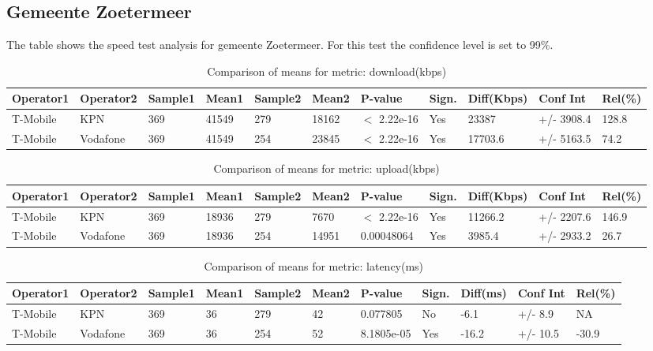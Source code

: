 \documentclass[]{article}
\begin{document}
\normalsize

\newpage

\subsection{Gemeente Zoetermeer}\label{gemeente-zoetermeer}

The table shows the speed test analysis for gemeente Zoetermeer. For
this test the confidence level is set to 99\%.

\begin{table}[ht]
\centering
{\footnotesize
\begin{tabular}{lllllllllll}
  \hline
Operator1 & Operator2 & Sample1 & Mean1 & Sample2 & Mean2 & P-value & Sign. & Diff(Kbps) & Conf Int & Rel(\%) \\ 
  \hline
T-Mobile & KPN & 369 & 41549 & 279 & 18162 & $<$ 2.22e-16 & Yes & 23387 & +/- 3908.4 & 128.8 \\ 
  T-Mobile & Vodafone & 369 & 41549 & 254 & 23845 & $<$ 2.22e-16 & Yes & 17703.6 & +/- 5163.5 & 74.2 \\ 
   \hline
\end{tabular}
}
\caption{Comparison of means for metric: download(kbps)} 
\end{table}

\begin{table}[ht]
\centering
{\footnotesize
\begin{tabular}{lllllllllll}
  \hline
Operator1 & Operator2 & Sample1 & Mean1 & Sample2 & Mean2 & P-value & Sign. & Diff(Kbps) & Conf Int & Rel(\%) \\ 
  \hline
T-Mobile & KPN & 369 & 18936 & 279 & 7670 & $<$ 2.22e-16 & Yes & 11266.2 & +/- 2207.6 & 146.9 \\ 
  T-Mobile & Vodafone & 369 & 18936 & 254 & 14951 & 0.00048064 & Yes & 3985.4 & +/- 2933.2 & 26.7 \\ 
   \hline
\end{tabular}
}
\caption{Comparison of means for metric: upload(kbps)} 
\end{table}

\begin{table}[ht]
\centering
{\footnotesize
\begin{tabular}{lllllllllll}
  \hline
Operator1 & Operator2 & Sample1 & Mean1 & Sample2 & Mean2 & P-value & Sign. & Diff(ms) & Conf Int & Rel(\%) \\ 
  \hline
T-Mobile & KPN & 369 & 36 & 279 & 42 & 0.077805 & No & -6.1 & +/- 8.9 & NA \\ 
  T-Mobile & Vodafone & 369 & 36 & 254 & 52 & 8.1805e-05 & Yes & -16.2 & +/- 10.5 & -30.9 \\ 
   \hline
\end{tabular}
}
\caption{Comparison of means for metric: latency(ms)} 
\end{table}
\end{document}
